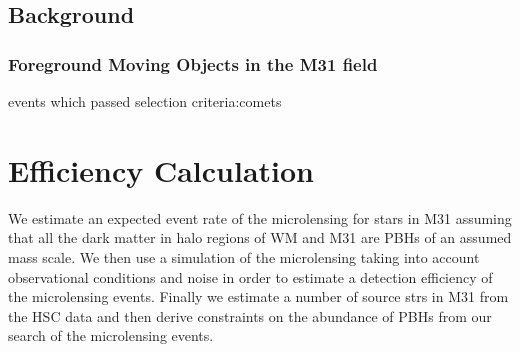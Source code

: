 \documentclass[iop, apj]{emulateapj}
\newcommand{\?}{\stackrel{?}{=}}
\begin{document}
\subsection{Background}
\subsubsection{Foreground Moving Objects in the M31 field}%
events which passed selection criteria:comets



\section{Efficiency Calculation}
We estimate an expected event rate of the microlensing for stars in M31 assuming that all the dark matter in halo regions of WM and M31 are PBHs of an assumed mass scale. 
We then use a simulation of the microlensing taking into account observational conditions and noise in order to estimate a detection efficiency of the microlensing events. 
Finally we estimate a number of source strs in M31 from the HSC data and then derive constraints on the abundance of PBHs from our search of the microlensing events. 
\end{document}
